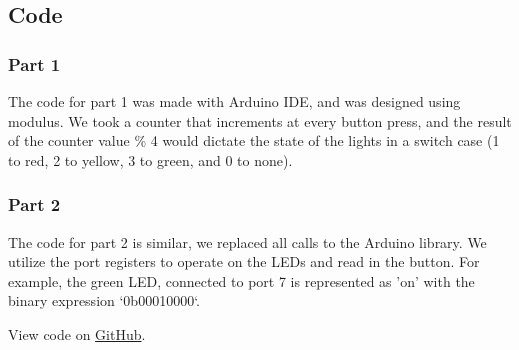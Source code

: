 \documentclass{article}
\begin{document}
\subsection{Code}

\subsubsection{Part 1}

The code for part 1 was made with Arduino IDE, and was designed using modulus. We took a counter that increments at every button press, and the result of the counter value \% 4 would dictate the state of the lights in a switch case (1 to red, 2 to yellow, 3 to green, and 0 to none).

\subsubsection{Part 2}

The code for part 2 is similar, we replaced all calls to the Arduino library. We utilize the port registers to operate on the LEDs and read in the button. For example, the green LED, connected to port 7 is represented as 'on' with the binary expression `0b00010000`.
 
View code on \href{https://github.com/jrkre/cpe-301}{GitHub}.
\end{document}
